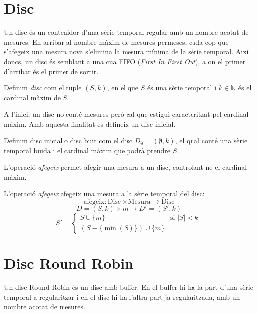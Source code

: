 \section{Disc}\label{sec:model:disc}

Un disc és un contenidor d'una sèrie temporal regular amb un nombre acotat de mesures. En arribar al nombre màxim de mesures permeses, cada cop que s'afegeix una mesura nova s'elimina la mesura mínima de la sèrie temporal.
Així doncs, un disc és semblant a una cua FIFO (\emph{First In First Out}), a on el primer d'arribar és el primer de sortir.  

\begin{definition}[Disc]
  Definim \emph{disc} com el tuple $(S,k)$, en el que $S$
  és una sèrie temporal i $k\in\mathbb{N}$ és el cardinal màxim de $S$.
\end{definition}

A l'inici, un disc no conté mesures però cal que estigui caracteritzat pel cardinal màxim. Amb aquesta finalitat es defineix un disc inicial.

\begin{definition}\label{def:disc_buit}
  Definim disc inicial o disc buit com el disc $D_{\emptyset} =
  (\emptyset,k)$, el qual conté una sèrie temporal buida i el cardinal
  màxim que podrà prendre $S$.
\end{definition}

L'operació \emph{afegeix} permet afegir una mesura a un disc, controlant-ne el cardinal màxim.

\begin{definition}
  L'operació \emph{afegeix} afegeix una mesura a la sèrie temporal del disc:
  \[
  \text{afegeix}: \text{Disc} \times \text{Mesura} \longrightarrow \text{Disc}
  \]
  \[
  D=(S,k) \times m \longrightarrow D'= (S',k)
  \]
  \[
  S' =  
  \begin{cases}
      S\cup\{m\} &\text{si }  |S|<k\\
      (S-\{\min(S)\}) \cup \{m\} 
    \end{cases}  \
  \]
\end{definition}


\section{Disc Round Robin}\label{sec:model:discroundrobin}

Un disc Round Robin és un disc amb buffer. En el buffer hi ha la part d'una sèrie temporal a regularitzar i en el disc hi ha l'altra part ja regularitzada, amb un nombre acotat de mesures. 

